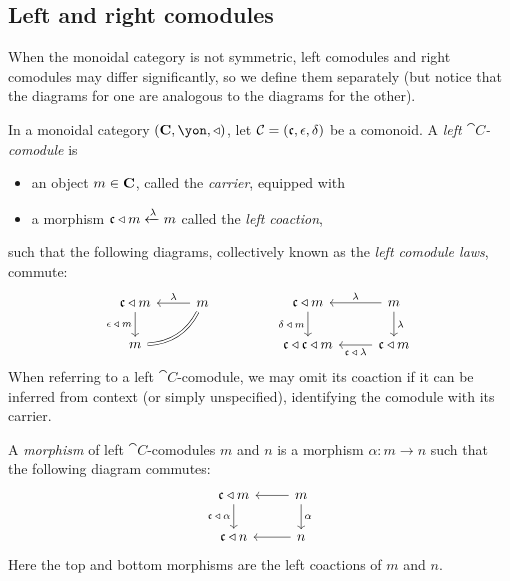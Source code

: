 \documentclass[Book-Poly]{subfiles}
\begin{document}
\subsection{Left and right comodules}

When the monoidal category is not symmetric, left comodules and right comodules may differ significantly, so we define them separately (but notice that the diagrams for one are analogous to the diagrams for the other).

\begin{definition}\label{def.left_comod}
In a monoidal category $(\Cat{C},\yon,\tri)$, let $\mathcal{C}=(\mathfrak{c},\epsilon,\delta)$ be a comonoid.
A \emph{left $\cat{C}$-comodule} is
\begin{itemize}
    \item an object $m\in\mathbf{C}$, called the \emph{carrier}, equipped with
    \item a morphism $\mathfrak{c}\mathbin{\triangleleft} m\xleftarrow{\lambda}m$ called the \emph{left coaction},
\end{itemize}
such that the following diagrams, collectively known as the \emph{left comodule laws}, commute:
\begin{equation} \label{eqn.left_comod_laws}
\begin{tikzcd}[ampersand replacement=\&]
	\car{c}\tri m\ar[d, "\epsilon\:\tri\:m"']\&
	m\ar[l, "\lambda"']\ar[dl, equal, bend left]\\
	m
\end{tikzcd}
\hspace{.6in}
\begin{tikzcd}[ampersand replacement=\&]
	\car{c}\tri m\ar[d, "\delta\:\tri\:m"']\&
	m\ar[l, "\lambda"']\ar[d, "\lambda"]\\
	\car{c}\tri\car{c}\tri m\&
	\car{c}\tri m\ar[l, "\car{c}\:\tri\:\lambda"]
\end{tikzcd}
\end{equation}
When referring to a left $\cat{C}$-comodule, we may omit its coaction if it can be inferred from context (or simply unspecified), identifying the comodule with its carrier.

A \emph{morphism} of left $\cat{C}$-comodules $m$ and $n$ is a morphism $\alpha\colon m\to n$ such that the following diagram commutes:
\[
\begin{tikzcd}
	\car{c}\tri m \ar[d, "\car{c}\:\tri\:\alpha"'] &
	m \ar[l] \ar[d, "\alpha"] \\
	\car{c}\tri n &
	n \ar[l]
\end{tikzcd}
\]
Here the top and bottom morphisms are the left coactions of $m$ and $n$.
\end{definition}
\end{document}
